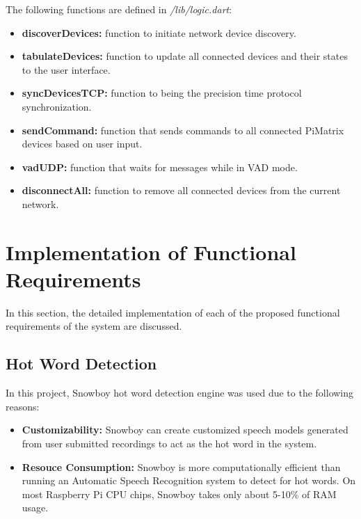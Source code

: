 \documentclass[hidelinks,12pt]{report} %
\begin{document}
The following functions are defined in \textit{/lib/logic.dart}:

	\begin{itemize}
		\item{\textbf{discoverDevices: }}
		function to initiate network device discovery. 
	
		\item{\textbf{tabulateDevices: }}
		function to update all connected devices and their states to the user interface.

		\item{\textbf{syncDevicesTCP: }}
		function to being the precision time protocol synchronization.

		\item{\textbf{sendCommand: }}
		function that sends commands to all connected PiMatrix devices based on user input.

		\item{\textbf{vadUDP: }}
		function that waits for messages while in VAD mode.

		\item{\textbf{disconnectAll: }}
		function to remove all connected devices from the current network.
	
		
	\end{itemize}



\section{Implementation of Functional Requirements}

In this section, the detailed implementation of each of the proposed functional requirements of the system are discussed.

\subsection{Hot Word Detection}

In this project, Snowboy hot word detection engine was used due to the following reasons:

	\begin{itemize}
		\item{\textbf{Customizability: }}
		Snowboy can create customized speech models generated from user submitted recordings to act as the hot word in the system.
	
		\item{\textbf{Resouce Consumption: }}
		Snowboy is more computationally efficient than running an Automatic Speech Recognition system to detect for hot words. On most Raspberry Pi CPU chips, Snowboy takes only about 5-10\% of RAM usage\cite{39}. 
	\end{itemize}
\end{document}
